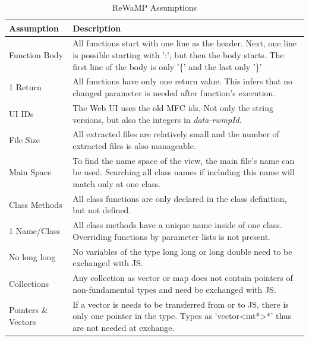 \begin{appendix}
\begin{table}[h]
\caption{ReWaMP Assumptions}
\label{tbl:rewamp-assump}
\centering
\def\arraystretch{1.35}
\setlength{\arrayrulewidth}{1.2pt}
\begin{tabularx}{\textwidth}{l X}
	Assumption & Description\\
	\hline
	Function Body & All functions start with one line as the header. Next, one line is possible starting with ':', but then the body starts. The first line of the body is only '\{' and the last only '\}'\\
	1 Return & All functions have only one return value. This infers that no changed parameter is needed after function's execution.\\
	UI IDs & The Web UI uses the old MFC ids. Not only the string versions, but also the integers in \emph{data-rwmpId}.\\
	File Size & All extracted files are relatively small and the number of extracted files is also manageable.\\
	Main Space & To find the name space of the view, the main file's name can be used. Searching all class names if including this name will match only at one class.\\
	Class Methods & All class functions are only declared in the class definition, but not defined.\\
	1 Name/Class & All class methods have a unique name inside of one class. Overriding functions by parameter lists is not present.\\
	No long long & No variables of the type long long or long double need to be exchanged with JS.\\
	Collections & Any collection as vector or map does not contain pointers of non-fundamental types and need be exchanged with JS.\\
	Pointers \& Vectors & If a vector is needs to be transferred from or to JS, there is only one pointer in the type. Types as 'vector<int*>*' thus are not needed at exchange. \\
\end{tabularx}
\end{table}


\end{appendix}

